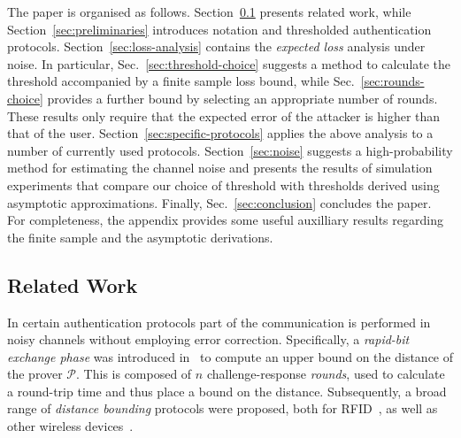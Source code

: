 \documentclass[a4paper]{article}
\newcommand \auth {\mathcal{P}}
\theoremstyle{plain} \newtheorem{remark}{Remark}
\theoremstyle{plain} \newtheorem{definition}{Definition}
\theoremstyle{plain} \newtheorem{example}{Example}
\theoremstyle{plain} \newtheorem{assumption}{Assumption}
\theoremstyle{plain} \newtheorem{conjecture}{Conjecture}
\theoremstyle{plain} \newtheorem{theorem}{Theorem}
\theoremstyle{plain} \newtheorem{proposition}{Proposition}
\theoremstyle{plain} \newtheorem{lemma}{Lemma}
\theoremstyle{plain} \newtheorem{corollary}{Corollary}
\begin{document}
The paper is organised as follows. Section~\ref{sec:relatedwork}
presents related work, while Section~\ref{sec:preliminaries}
introduces notation and thresholded authentication
protocols. Section~\ref{sec:loss-analysis} contains the
\textit{expected loss} analysis under noise. In particular,
Sec.~\ref{sec:threshold-choice} suggests a method to calculate the
threshold accompanied by a finite sample loss bound, while
Sec.~\ref{sec:rounds-choice} provides a further bound by selecting an
appropriate number of rounds. These results only require that the
expected error of the attacker is higher than that of the
user. Section~\ref{sec:specific-protocols} applies the above analysis
to a number of currently used protocols.  Section~\ref{sec:noise}
suggests a high-probability method for estimating the channel noise
and presents the results of simulation experiments that compare our
choice of threshold with thresholds derived using asymptotic
approximations. Finally, Sec.~\ref{sec:conclusion} concludes the
paper. For completeness, the appendix provides some useful auxilliary
results regarding the finite sample and the asymptotic derivations.

\subsection{Related Work}
\label{sec:relatedwork}
In certain authentication protocols part of the communication is
performed in noisy channels without employing error correction.
Specifically, a {\em rapid-bit exchange phase} was introduced
in~\cite{brands94} to compute an upper bound on the distance of the
prover $\auth$.  This is composed of $n$ challenge-response
\textit{rounds}, used to calculate a round-trip time and thus place a
bound on the distance.  Subsequently, a broad range of
\textit{distance bounding} protocols were proposed, both for
RFID~\cite{hancke05, KimAKSP-2008-icisc, reid2007, singelee1,
  sheddingLight}, as well as other wireless devices~\cite{capkun,
  capkun2, tippenhauer}.
\end{document}
